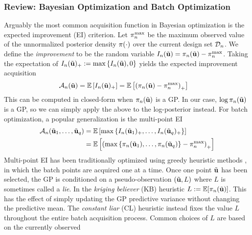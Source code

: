 \documentclass[12pt]{article}
\begin{document}
\subsubsection{Review: Bayesian Optimization and Batch Optimization}
Arguably the most common acquisition function in Bayesian optimization is the expected improvement (EI) criterion. Let 
$\postDens_{\designIdx}^{\text{max}}$ be the maximum observed value of the unnormalized posterior density 
$\postDens(\cdot)$ over the current design set $\indexDesign{\designData}$. We define the \textit{improvement} to be the random 
variable $\indexDesign{I}(\tilde{\bpar}) = \indexDesign{\postDens}(\tilde{\bpar}) - \postDens_{\designIdx}^{\text{max}}$. Taking the expectation 
of $\indexDesign{I}(\tilde{\bpar})_+ := \max\left\{\indexDesign{I}(\tilde{\bpar}), 0\right\}$ yields the expected improvement acquisition 
\begin{align}
\acq[\designIdx](\tilde{\bpar}) &= \E\left[\indexDesign{I}(\tilde{\bpar})_+ \right] = \E\left[\left( \indexDesign{\postDens}(\tilde{\bpar}) - \postDens_{\designIdx}^{\text{max}}\right)_+ \right] 
\end{align}
This can be computed in closed-form when $\indexDesign{\postDens}(\tilde{\bpar})$ is a GP. In our case, $\log \indexDesign{\postDens}(\tilde{\bpar})$ is a GP, so we can 
simply apply the above to the log-posterior instead. For batch optimization, a popular generalization is the multi-point EI 
\begin{align}
\acq[\designIdx](\tilde{\bpar}_1, \dots, \tilde{\bpar}_q) &= \E\left[\max\left\{\indexDesign{I}(\tilde{\bpar}_1)_+, \dots, \indexDesign{I}(\tilde{\bpar}_q)_+\right\} \right] \\
&= \E\left[\left(\max\left\{\indexDesign{\postDens}(\tilde{\bpar}_1), \dots, \indexDesign{\postDens}(\tilde{\bpar}_q) \right\} - \postDens_{\designIdx}^{\text{max}} \right)_+ \right]
\end{align}
Multi-point EI has been traditionally optimized using greedy heuristic methods \cite{Ginsbourger2010}, in which the batch points are acquired one at a time. Once 
one point $\tilde{\bpar}$ has been selected, the GP is conditioned on a pseudo-observation $(\tilde{\bpar}, L)$ where $L$ is sometimes called a \textit{lie}. In the 
\textit{kriging believer} (KB) heuristic $L := \E[\indexDesign{\postDens}(\tilde{\bpar})]$. This has the effect of simply updating the GP predictive variance without changing the predictive 
mean. The \textit{constant liar} (CL) heuristic instead fixes the value $L$ throughout the entire batch acquisition process. Common choices of $L$ are based on the currently observed
\end{document}
